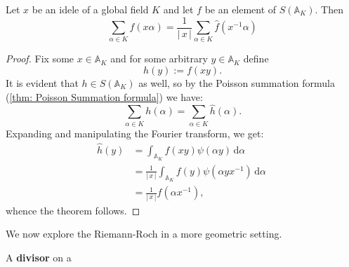 \documentclass[11pt, x11names]{article}
\renewcommand{\aa}{\mathbb{A}}
\newcommand{\abs}[1]{\left| \, #1  \,\right|}
\renewcommand{\hat}{\widehat}
\newcommand{\inv}[1]{#1^{-1}}
\renewcommand{\d}[1]{\, \mathrm{d}#1 \ }
\begin{document}
\begin{theorem}
\label{thm: Riemann-Roch}
Let $x$ be an idele of a global field $K$ and let $f$ be an element of $S(\aa_K)$. Then
\begin{equation*}
    \sum_{ \alpha \in K}f(x\alpha ) = \frac{1}{\abs{x}}\sum_{\alpha  \in K} \hat{f}(\inv{x}\alpha)
\end{equation*}
\end{theorem}
\begin{proof}
Fix some $x \in \aa_K$ and for some arbitrary $y \in \aa_K$ define
\begin{equation*}
    h(y) := f(xy).
\end{equation*}
It is evident that $h \in S(\aa_K)$ as well, so by the Poisson summation formula (\ref{thm: Poisson Summation formula}) we have:
\begin{equation*}
    \sum_{\alpha \in K} h(\alpha) = \sum_{\alpha \in K} \hat{h}(\alpha).
\end{equation*}
Expanding and manipulating the Fourier transform, we get:
\begin{align*}
    \hat{h}(y) &= \int_{\aa_K} f(xy) \psi(\alpha y) \d{\alpha}\\
    &= \frac{1}{\abs{x}} \int_{\aa_K} f(y) \psi(\alpha y \inv{x}) \d{\alpha}\\
    &= \frac{1}{\abs{x}} \hat{f}(\alpha \inv{x}),
\end{align*}
whence the theorem follows.
\end{proof}

We now explore the Riemann-Roch in a more geometric setting.
\begin{defn}
    A \textbf{divisor} on a 
\end{defn}
\end{document}
